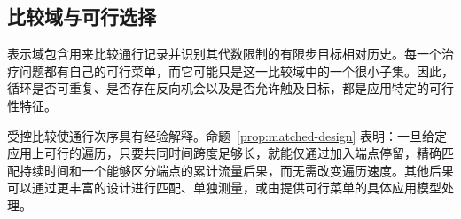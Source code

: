 \subsection{比较域与可行选择}

表示域包含用来比较通行记录并识别其代数限制的有限步目标相对历史。每一个治疗问题都有自己的可行菜单，而它可能只是这一比较域中的一个很小子集。因此，循环是否可重复、是否存在反向机会以及是否允许触及目标，都是应用特定的可行性特征。

受控比较使通行次序具有经验解释。命题~\ref{prop:matched-design} 表明：一旦给定应用上可行的遍历，只要共同时间跨度足够长，就能仅通过加入端点停留，精确匹配持续时间和一个能够区分端点的累计流量后果，而无需改变遍历速度。其他后果可以通过更丰富的设计进行匹配、单独测量，或由提供可行菜单的具体应用模型处理。

